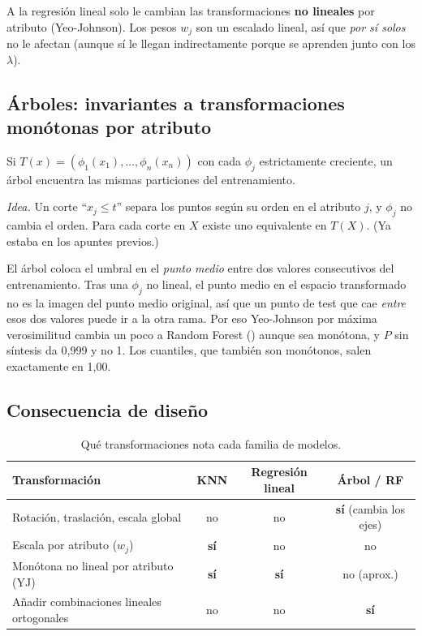 \documentclass[apuntes]{uc3mmaster}
\begin{document}
A la regresión lineal solo le cambian las transformaciones \textbf{no lineales} por atributo (Yeo-Johnson). Los pesos
$w_j$ son un escalado lineal, así que \emph{por sí solos} no le afectan (aunque sí le llegan indirectamente porque
se aprenden junto con los $\lambda$).

\subsection{Árboles: invariantes a transformaciones monótonas por atributo}
\begin{proposicion}
Si $T(x)=(\phi_1(x_1),\dots,\phi_n(x_n))$ con cada $\phi_j$ estrictamente creciente, un árbol encuentra las mismas
particiones del entrenamiento.
\end{proposicion}
\textit{Idea.} Un corte ``$x_j\le t$'' separa los puntos según su orden en el atributo $j$, y $\phi_j$ no cambia el
orden. Para cada corte en $X$ existe uno equivalente en $T(X)$. (Ya estaba en los apuntes previos.)

\begin{cuidado}
El árbol coloca el umbral en el \emph{punto medio} entre dos valores consecutivos del entrenamiento. Tras una
$\phi_j$ no lineal, el punto medio en el espacio transformado no es la imagen del punto medio original, así que un
punto de test que cae \emph{entre} esos dos valores puede ir a la otra rama. Por eso Yeo-Johnson por máxima
verosimilitud cambia un poco a Random Forest (\compYJMVRF) aunque sea monótona, y $P$ sin síntesis da 0,999 y no 1.
Los cuantiles, que también son monótonos, salen exactamente en 1,00.
\end{cuidado}

\subsection{Consecuencia de diseño}
\begin{table}[h]\centering\small
\caption{Qué transformaciones nota cada familia de modelos.}
\begin{tabular}{@{}lccc@{}}\toprule
Transformación & KNN & Regresión lineal & Árbol / RF\\\midrule
Rotación, traslación, escala global & no & no & \textbf{sí} (cambia los ejes)\\
Escala por atributo ($w_j$) & \textbf{sí} & no & no\\
Monótona no lineal por atributo (YJ) & \textbf{sí} & \textbf{sí} & no (aprox.)\\
Añadir combinaciones lineales ortogonales & no & no & \textbf{sí}\\\bottomrule
\end{tabular}
\end{table}
\end{document}
